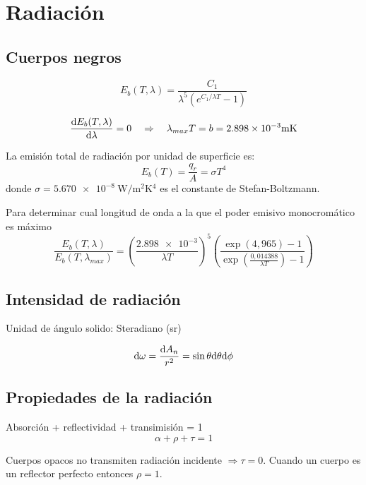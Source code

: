 \section{Radiación}

\subsection{Cuerpos negros}

\begin{equation}
    E_{b}(T,\lambda)=\frac{C_1}{\lambda^5 (e^{C_1/\lambda T} -1)}
\end{equation}

\begin{equation}
    \frac{\textrm{d} E_{b}(T,\lambda)}{\textrm{d} \lambda}=0 \quad \Rightarrow \quad \lambda_{max} T = b= \num{2,898e-3} \si{\milli \kelvin}
\end{equation}

La emisión total de radiación por unidad de superficie es:
\begin{equation}
    E_b(T) = \frac{q_r}{A} = \sigma T^4
\end{equation}
donde $\sigma=\SI{5,670e-8}{\watt \per \meter \squared \kelvin^4 } $ es el constante de Stefan-Boltzmann.

Para determinar cual longitud de onda a la que el poder emisivo monocromático es máximo
\begin{equation}
    \frac{E_b (T,\lambda)}{E_b (T,\lambda_{max})}=\left( \frac{\num{2,898e-3}}{\lambda T}\right)^5 \left( \frac{\exp(4,965)-1}{\exp(\frac{0,014388}{\lambda T})-1} \right)
\end{equation}

\subsection{Intensidad de radiación}
Unidad de ángulo solido: Steradiano (sr)

\begin{equation}
    \textrm{d} \omega = \frac{\textrm{d} A_n}{r^2} = \sin \theta \textrm{d} \theta \textrm{d} \phi
\end{equation}

\subsection{Propiedades de la radiación}

Absorción + reflectividad + transimisión = 1
\[\alpha + \rho +\tau = 1 \]

Cuerpos opacos no transmiten radiación incidente $\Rightarrow \tau=0$. Cuando un cuerpo es un reflector perfecto entonces $\rho=1$.

